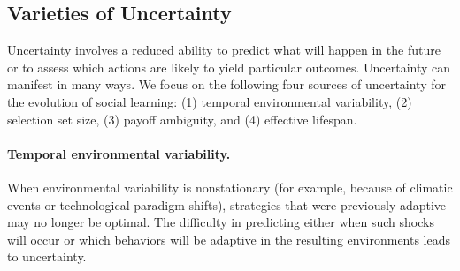 \documentclass[letterpaper,11.5pt]{scrartcl}
\newcommand{\mt}[1]{{\textcolor{myorange} {({\tiny MT:} #1)}}}
\newcommand{\cm}[1]{{\textcolor{mypurple} {({\tiny CM:} #1)}}}
\begin{document}



\subsection{Varieties of Uncertainty}

Uncertainty involves a reduced ability to predict what will happen in the future or to assess which actions are likely to yield particular outcomes. Uncertainty can manifest in many ways. We focus on the following four sources of uncertainty for the evolution of social learning: (1) temporal environmental variability, (2) selection set size, (3) payoff ambiguity, and (4) effective lifespan.

\paragraph{Temporal environmental variability.} When environmental variability is nonstationary (for example, because of climatic events %
or technological paradigm shifts), strategies that were previously adaptive may no longer be optimal. The difficulty in predicting either when such shocks will occur or which behaviors will be adaptive in the resulting environments leads to uncertainty. 
\end{document}
